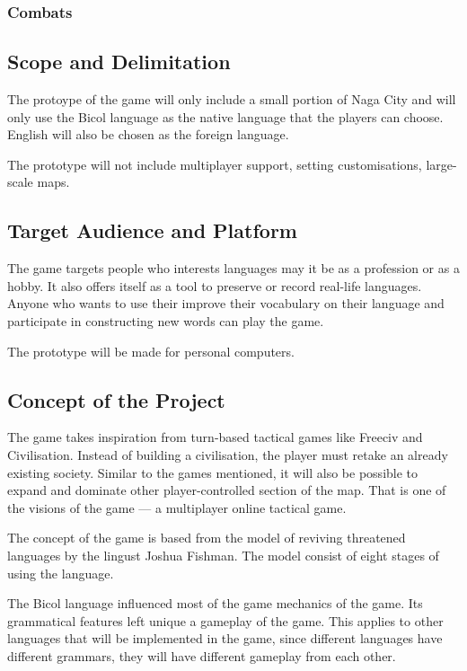 \documentclass[11pt]{article}
\begin{document}
\subsubsection{Combats}



\subsection{Scope and Delimitation}
The protoype of the game will only include a small portion of Naga City and will only use the Bicol language as the native language that the players can choose. English will also be chosen as the foreign language.

The prototype will not include multiplayer support, setting customisations, large-scale maps.



\subsection{Target Audience and Platform}
The game targets people who interests languages may it be as a profession or as a hobby. It also offers itself as a tool to preserve or record real-life languages. Anyone who wants to use their improve their vocabulary on their language and participate in constructing new words can play the game.

The prototype will be made for personal computers.

\subsection{Concept of the Project}
The game takes inspiration from turn-based tactical games like Freeciv and Civilisation. Instead of building a civilisation, the player must retake an already existing society. Similar to the games mentioned, it will also be possible to expand and dominate other player-controlled section of the map. That is one of the visions of the game --- a multiplayer online tactical game.

The concept of the game is based from the model of reviving threatened languages by the lingust Joshua Fishman. The model consist of eight stages of using the language.

The Bicol language influenced most of the game mechanics of the game. Its grammatical features left unique a gameplay of the game. This applies to other languages that will be implemented in the game, since different languages have different grammars, they will have different gameplay from each other.
\end{document}
